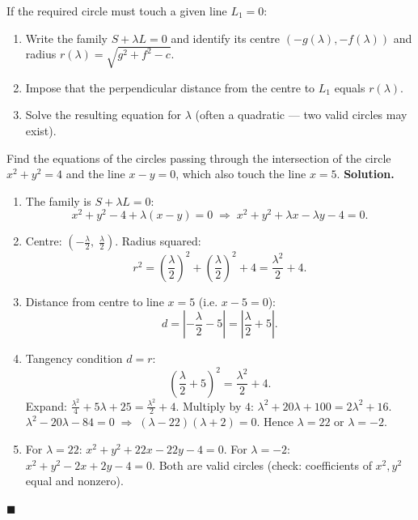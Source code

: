 \documentclass[11pt]{article}
\begin{document}
\begin{methode}[Using a tangency condition with $S + \lambda L = 0$]
If the required circle must touch a given line $L_1 = 0$:
\begin{enumerate}
  \item Write the family $S + \lambda L = 0$ and identify its centre $(-g(\lambda), -f(\lambda))$ and radius $r(\lambda) = \sqrt{g^2 + f^2 - c}$.
  \item Impose that the perpendicular distance from the centre to $L_1$ equals $r(\lambda)$.
  \item Solve the resulting equation for $\lambda$ (often a quadratic — two valid circles may exist).
\end{enumerate}
\end{methode}

\begin{exoresolu}
Find the equations of the circles passing through the intersection of the circle $x^2 + y^2 = 4$ and the line $x - y = 0$, which also touch the line $x = 5$.
\tcblower
\textbf{Solution.}
\begin{enumerate}
  \item The family is $S + \lambda L = 0$:
  \[ x^2 + y^2 - 4 + \lambda(x - y) = 0 \;\Longrightarrow\; x^2 + y^2 + \lambda x - \lambda y - 4 = 0. \]
  \item Centre: $\left(-\frac{\lambda}{2},\; \frac{\lambda}{2}\right)$. Radius squared:
  \[ r^2 = \left(\frac{\lambda}{2}\right)^2 + \left(\frac{\lambda}{2}\right)^2 + 4 = \frac{\lambda^2}{2} + 4. \]
  \item Distance from centre to line $x = 5$ (i.e. $x - 5 = 0$):
  \[ d = \left| -\frac{\lambda}{2} - 5 \right| = \left| \frac{\lambda}{2} + 5 \right|. \]
  \item Tangency condition $d = r$:
  \[ \left(\frac{\lambda}{2} + 5\right)^2 = \frac{\lambda^2}{2} + 4. \]
  Expand: $\frac{\lambda^2}{4} + 5\lambda + 25 = \frac{\lambda^2}{2} + 4$.
  Multiply by $4$: $\lambda^2 + 20\lambda + 100 = 2\lambda^2 + 16$.
  $\lambda^2 - 20\lambda - 84 = 0 \;\Longrightarrow\; (\lambda - 22)(\lambda + 2) = 0$.
  Hence $\lambda = 22$ or $\lambda = -2$.
  \item For $\lambda = 22$: $x^2 + y^2 + 22x - 22y - 4 = 0$.
  For $\lambda = -2$: $x^2 + y^2 - 2x + 2y - 4 = 0$.
  Both are valid circles (check: coefficients of $x^2,y^2$ equal and nonzero).
\end{enumerate}
$\blacksquare$
\end{exoresolu}
\end{document}
